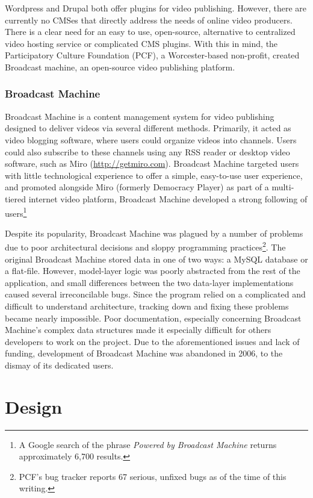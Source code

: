 \documentclass[a4paper,12pt]{report}
\begin{document}
Wordpress and Drupal both offer plugins for video publishing. However, there are currently no CMSes that directly address the needs of online video producers. There is a clear need for an easy to use, open-source, alternative to centralized video hosting service or complicated CMS plugins. With this in mind, the Participatory Culture Foundation (PCF), a Worcester-based non-profit, created Broadcast machine, an open-source video publishing platform.

\subsection {Broadcast Machine}
Broadcast Machine is a content management system for video publishing designed to deliver videos via several different methods. Primarily, it acted as video blogging software, where users could organize videos into channels. Users could also subscribe to these channels using any RSS reader or desktop video software, such as Miro (\url{http://getmiro.com}). Broadcast Machine targeted users with little technological experience to offer a simple, easy-to-use user experience, and promoted alongside Miro (formerly Democracy Player) as part of a multi-tiered internet video platform, Broadcast Machine developed a strong following of users\footnote{A Google search of the phrase \textit{Powered by Broadcast Machine} returns approximately 6,700 results.}

Despite its popularity, Broadcast Machine was plagued by a number of problems due to poor architectural decisions and sloppy programming practices\footnote{PCF's bug tracker reports 67 serious, unfixed bugs as of the time of this writing.}. The original Broadcast Machine stored data in one of two ways: a MySQL database or a flat-file. However, model-layer logic was poorly abstracted from the rest of the application, and small differences between the two data-layer implementations caused several irreconcilable bugs. Since the program relied on a complicated and difficult to understand architecture, tracking down and fixing these problems became nearly impossible. Poor documentation, especially concerning Broadcast Machine's complex data structures made it especially difficult for others developers to work on the project. Due to the aforementioned issues and lack of funding, development of Broadcast Machine was abandoned in 2006, to the dismay of its dedicated users.

\chapter{Design}
\end{document}
